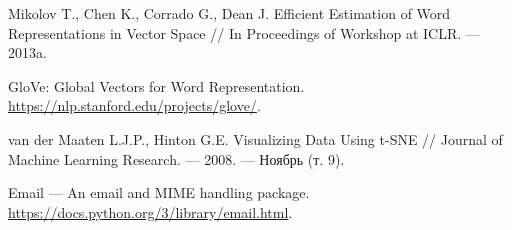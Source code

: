 \begin{thebibliography}{3}
Mikolov T., Chen K., Corrado G., Dean J. Efficient Estimation of Word Representations in Vector Space // In Proceedings of Workshop at ICLR. — 2013a.

GloVe: Global Vectors for Word Representation. \url{https://nlp.stanford.edu/projects/glove/}.

van der Maaten L.J.P., Hinton G.E. Visualizing Data Using t-SNE // Journal of Machine Learning Research. — 2008. — Ноябрь (т. 9).

Email — An email and MIME handling package. \url{https://docs.python.org/3/library/email.html}.

\end{thebibliography}


